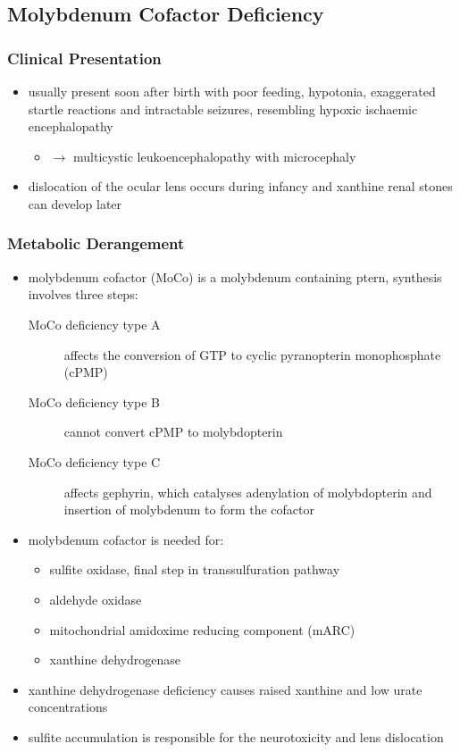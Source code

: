 \documentclass[12pt]{scrartcl}
\begin{document}
\begin{center}
\begin{center}
\subsection{Molybdenum Cofactor Deficiency}
\label{sec:orgfcd1e7b}
\subsubsection{Clinical Presentation}
\label{sec:org2f37cb4}
\begin{itemize}
\item usually present soon after birth with poor feeding, hypotonia,
exaggerated startle reactions and intractable seizures, resembling
hypoxic ischaemic encephalopathy
\begin{itemize}
\item \(\to\) multicystic leukoencephalopathy with microcephaly
\end{itemize}
\item dislocation of the ocular lens occurs during infancy and xanthine
renal stones can develop later
\end{itemize}

\subsubsection{Metabolic Derangement}
\label{sec:org040d65a}
\begin{itemize}
\item molybdenum cofactor (MoCo) is a molybdenum containing ptern,
synthesis involves three steps:
\begin{description}
\item[{MoCo deficiency type A}] affects the conversion of GTP to cyclic
pyranopterin monophosphate (cPMP)
\item[{MoCo deficiency type B}] cannot convert cPMP to molybdopterin
\item[{MoCo deficiency type C}] affects gephyrin, which catalyses
adenylation of molybdopterin and insertion of molybdenum to
form the cofactor
\end{description}
\item molybdenum cofactor is needed for:
\begin{itemize}
\item sulfite oxidase, final step in transsulfuration pathway
\item aldehyde oxidase
\item mitochondrial amidoxime reducing component (mARC)
\item xanthine dehydrogenase
\end{itemize}
\item xanthine dehydrogenase deficiency causes raised xanthine and low
urate concentrations
\item sulfite accumulation is responsible for the neurotoxicity and lens
dislocation
\end{itemize}


\end{center}
\end{center}
\end{document}
